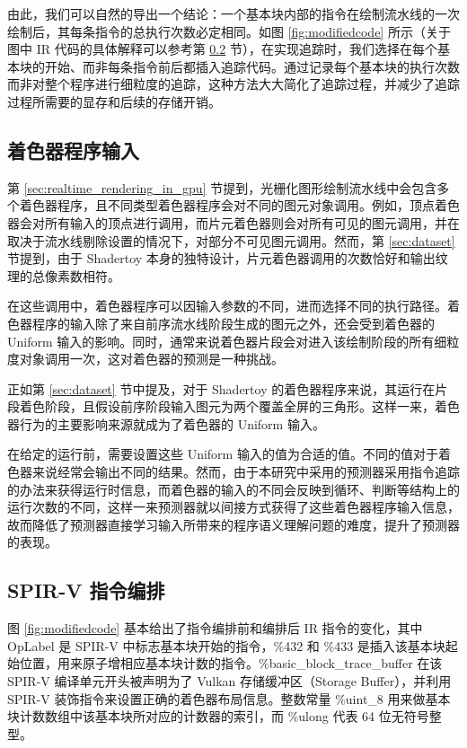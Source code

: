 由此，我们可以自然的导出一个结论：一个基本块内部的指令在绘制流水线的一次绘制后，其每条指令的总执行次数必定相同。如图 \ref{fig:modifiedcode} 所示（关于图中 IR 代码的具体解释可以参考第 \ref{sec:spv_compose} 节），在实现追踪时，我们选择在每个基本块的开始、而非每条指令前后都插入追踪代码。通过记录每个基本块的执行次数而非对整个程序进行细粒度的追踪，这种方法大大简化了追踪过程，并减少了追踪过程所需要的显存和后续的存储开销。

\subsection{着色器程序输入}

第 \ref{sec:realtime_rendering_in_gpu} 节提到，光栅化图形绘制流水线中会包含多个着色器程序，且不同类型着色器程序会对不同的图元对象调用。例如，顶点着色器会对所有输入的顶点进行调用，而片元着色器则会对所有可见的图元调用，并在取决于流水线剔除设置的情况下，对部分不可见图元调用。然而，第 \ref{sec:dataset} 节提到，由于 Shadertoy 本身的独特设计，片元着色器调用的次数恰好和输出纹理的总像素数相符。

在这些调用中，着色器程序可以因输入参数的不同，进而选择不同的执行路径。着色器程序的输入除了来自前序流水线阶段生成的图元之外，还会受到着色器的 Uniform 输入的影响。同时，通常来说着色器片段会对进入该绘制阶段的所有细粒度对象调用一次，这对着色器的预测是一种挑战。

正如第 \ref{sec:dataset} 节中提及，对于 Shadertoy 的着色器程序来说，其运行在片段着色阶段，且假设前序阶段输入图元为两个覆盖全屏的三角形。这样一来，着色器行为的主要影响来源就成为了着色器的 Uniform 输入。

在给定的运行前，需要设置这些 Uniform 输入的值为合适的值。不同的值对于着色器来说经常会输出不同的结果。然而，由于本研究中采用的预测器采用指令追踪的办法来获得运行时信息，而着色器的输入的不同会反映到循环、判断等结构上的运行次数的不同，这样一来预测器就以间接方式获得了这些着色器程序输入信息，故而降低了预测器直接学习输入所带来的程序语义理解问题的难度，提升了预测器的表现。

\subsection{SPIR-V 指令编排}

\label{sec:spv_compose}

图 \ref{fig:modifiedcode} 基本给出了指令编排前和编排后 IR 指令的变化，其中 OpLabel 是 SPIR-V 中标志基本块开始的指令，\%432 和 \%433 是插入该基本块起始位置，用来原子增相应基本块计数的指令。\%basic\_block\_trace\_buffer 在该 SPIR-V 编译单元开头被声明为了 Vulkan 存储缓冲区（Storage Buffer），并利用 SPIR-V 装饰指令来设置正确的着色器布局信息。整数常量 \%uint\_8 用来做基本块计数数组中该基本块所对应的计数器的索引，而 \%ulong 代表 64 位无符号整型。

